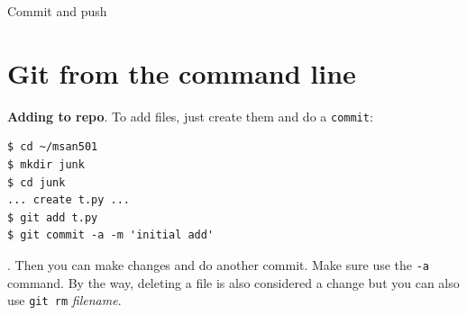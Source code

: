 \documentclass[titlepage]{tufte-book}
\begin{document}
\begin{marginfigure}
\vspace{-1in}
\begin{center}
\end{center}
\caption{Commit and push}
\end{marginfigure}


\section{Git from the command line}

{\bf Adding to repo}. To add files, just create them and do a {\tt commit}:

\begin{lstlisting}[style=BashInputStyle]
$ cd ~/msan501
$ mkdir junk
$ cd junk
... create t.py ...
$ git add t.py
$ git commit -a -m 'initial add'
\end{lstlisting}

. Then you can make changes and do another commit. Make sure use the {\tt -a} command. By the way, deleting a file is also considered a change but you can also use {\tt git rm} {\em filename}.
\end{document}
